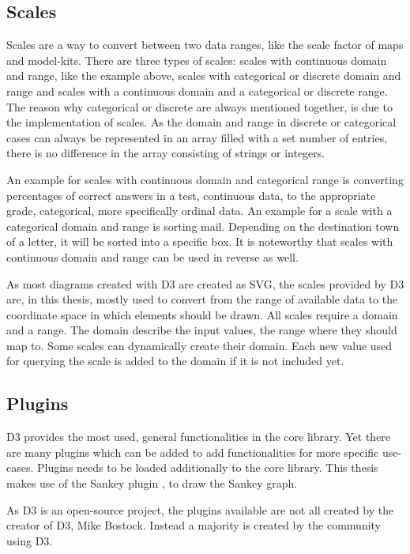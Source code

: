 \subsection{Scales}

Scales are a way to convert between two data ranges, like the scale factor of maps and model-kits.
There are three types of scales: scales with continuous domain and range, like the example above, scales with categorical or discrete domain and range and scales with a continuous domain and a categorical or discrete range. The reason why categorical or discrete are always mentioned together, is due to the implementation of scales. As the domain and range in discrete or categorical cases can always be represented in an array filled with a set number of entries, there is no difference in the array consisting of strings or integers.

An example for scales with continuous domain and categorical range is converting percentages of correct answers in a test, continuous data, to the appropriate grade, categorical, more specifically ordinal data. An example for a scale with a categorical domain and range is sorting mail. Depending on the destination town of a letter, it will be sorted into a specific box.
It is noteworthy that scales with continuous domain and range can be used in reverse as well.

As most diagrams created with D3 are created as SVG, the scales provided by D3 are, in this thesis, mostly used to convert from the range of available data to the coordinate space in which elements should be drawn. All scales require a domain and a range. The domain describe the input values, the range where they should map to. Some scales can dynamically create their domain. Each new value used for querying the scale is added to the domain if it is not included yet.

\subsection{Plugins}

D3 provides the most used, general functionalities in the core library. Yet there are many plugins which can be added to add functionalities for more specific use-cases. Plugins needs to be loaded additionally to the core library. This thesis makes use of the Sankey plugin \cite{Sankey_package}, to draw the Sankey graph.

As D3 is an open-source project, the plugins available are not all created by the creator of D3, Mike Bostock. Instead a majority is created by the community using D3.
